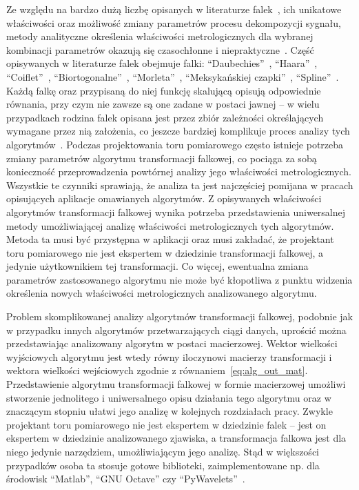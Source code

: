Ze względu na bardzo dużą liczbę opisanych w literaturze falek~\cite{akujuobi_applications}, ich unikatowe właściwości oraz możliwość zmiany parametrów procesu dekompozycji sygnału, metody analityczne określenia właściwości metrologicznych dla wybranej kombinacji parametrów okazują się czasochłonne i niepraktyczne~\cite{yan_uncertainty, wilczok_uncertainty, peretto_uncertainty, sarrafi_uncertainty}. Część opisywanych w literaturze falek obejmuje falki: \enquote{Daubechies}~\cite{vonesch_dbbasics}, \enquote{Haara}~\cite{stankovic_haar}, \enquote{Coiflet}~\cite{wei_coiflet}, \enquote{Biortogonalne}~\cite{sweldens_bior}, \enquote{Morleta}~\cite{cohen_morlet}, \enquote{Meksykańskiej czapki}~\cite{singh_mexican}, \enquote{Spline}~\cite{averbuch_spline, wang_splinebasics}. Każdą falkę oraz przypisaną do niej funkcję skalującą opisują odpowiednie równania, przy czym nie zawsze są one zadane w postaci jawnej -- w wielu przypadkach rodzina falek opisana jest przez zbiór zależności określających wymagane przez nią założenia, co jeszcze bardziej komplikuje proces analizy tych algorytmów~\cite{rowe_dbmath}. Podczas projektowania toru pomiarowego często istnieje potrzeba zmiany parametrów algorytmu transformacji falkowej, co pociąga za sobą konieczność przeprowadzenia powtórnej analizy jego właściwości metrologicznych. Wszystkie te czynniki sprawiają, że analiza ta jest najczęściej pomijana w pracach opisujących aplikacje omawianych algorytmów. Z opisywanych właściwości algorytmów transformacji falkowej wynika potrzeba przedstawienia uniwersalnej metody umożliwiającej analizę właściwości metrologicznych tych algorytmów. Metoda ta musi być przystępna w aplikacji oraz musi zakładać, że projektant toru pomiarowego nie jest ekspertem w dziedzinie transformacji falkowej, a jedynie użytkownikiem tej transformacji. Co więcej, ewentualna zmiana parametrów zastosowanego algorytmu nie może być kłopotliwa z punktu widzenia określenia nowych właściwości metrologicznych analizowanego algorytmu.

Problem skomplikowanej analizy algorytmów transformacji falkowej, podobnie jak w przypadku innych algorytmów przetwarzających ciągi danych, uprościć można przedstawiając analizowany algorytm w postaci macierzowej. Wektor wielkości wyjściowych algorytmu jest wtedy równy iloczynowi macierzy transformacji i wektora wielkości wejściowych zgodnie z równaniem~\eqref{eq:alg_out_mat}. Przedstawienie algorytmu transformacji falkowej w formie macierzowej umożliwi stworzenie jednolitego i uniwersalnego opisu działania tego algorytmu oraz w znaczącym stopniu ułatwi jego analizę w kolejnych rozdziałach pracy. Zwykle projektant toru pomiarowego nie jest ekspertem w dziedzinie falek -- jest on ekspertem w dziedzinie analizowanego zjawiska, a transformacja falkowa jest dla niego jedynie narzędziem, umożliwiającym jego analizę. Stąd w większości przypadków osoba ta stosuje gotowe biblioteki, zaimplementowane np. dla środowisk \enquote{Matlab}, \enquote{GNU Octave} czy \enquote{PyWavelets}~\cite{lee_pywavelets, misiti_matlabwav}.


